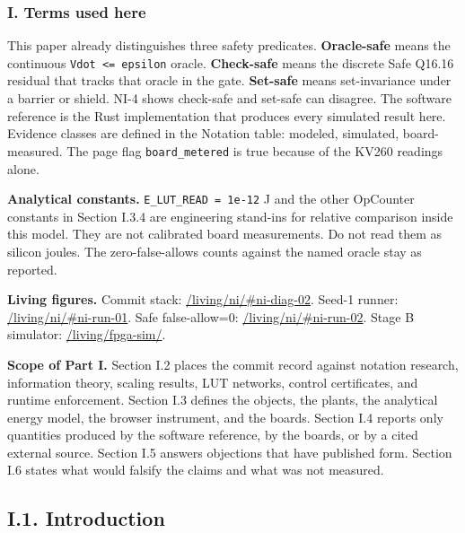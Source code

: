 \documentclass[
  10pt,
]{article}
\begin{document}
\subsubsection{I. Terms used here}\label{i.-terms-used-here}

This paper already distinguishes three safety predicates.
\textbf{Oracle-safe} means the continuous
\texttt{Vdot\ \textless{}=\ epsilon} oracle. \textbf{Check-safe} means
the discrete Safe Q16.16 residual that tracks that oracle in the gate.
\textbf{Set-safe} means set-invariance under a barrier or shield. NI-4
shows check-safe and set-safe can disagree. The software reference is
the Rust implementation that produces every simulated result here.
Evidence classes are defined in the Notation table: modeled, simulated,
board-measured. The page flag \texttt{board\_metered} is true because of
the KV260 readings alone.

\textbf{Analytical constants.} \texttt{E\_LUT\_READ\ =\ 1e-12} J and the
other OpCounter constants in Section I.3.4 are engineering stand-ins for
relative comparison inside this model. They are not calibrated board
measurements. Do not read them as silicon joules. The zero-false-allows
counts against the named oracle stay as reported.

\textbf{Living figures.} Commit stack:
\href{https://research.openie.dev/living/ni/\#ni-diag-02}{/living/ni/\#ni-diag-02}.
Seed-1 runner:
\href{https://research.openie.dev/living/ni/\#ni-run-01}{/living/ni/\#ni-run-01}.
Safe false-allow=0:
\href{https://research.openie.dev/living/ni/\#ni-run-02}{/living/ni/\#ni-run-02}.
Stage B simulator:
\href{https://research.openie.dev/living/fpga-sim/}{/living/fpga-sim/}.

\textbf{Scope of Part I.} Section I.2 places the commit record against
notation research, information theory, scaling results, LUT networks,
control certificates, and runtime enforcement. Section I.3 defines the
objects, the plants, the analytical energy model, the browser
instrument, and the boards. Section I.4 reports only quantities produced
by the software reference, by the boards, or by a cited external source.
Section I.5 answers objections that have published form. Section I.6
states what would falsify the claims and what was not measured.

\subsection{I.1. Introduction}\label{i.1.-introduction}
\end{document}
